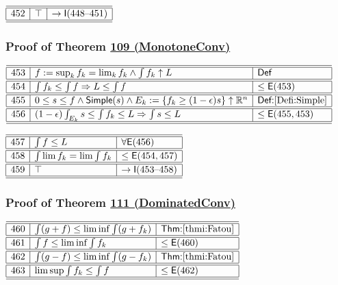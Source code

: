 \documentclass[11pt,reqno]{amsart}
\begin{document}
\medskip

\noindent$%
\begin{array}{|r|l|l|}
\hline\hline
452 & \top & \to\mathsf{I}(448\text{--}451) \\ \hline\hline
\end{array}%
$

\medskip

\subsubsection*{Proof of Theorem \hyperlink{thm:MonotoneConv}{109 (\textsf{MonotoneConv})}}

\noindent$%
\begin{array}{|r|l|l|}
\hline\hline
453 & f:=\sup_{k}f_{k}=\lim_{k}f_{k}\wedge\int f_{k}\uparrow L & \mathsf{Def} \\ \hline\hline
454 & \int f_{k}\le\int f\Rightarrow L\le\int f & \le\mathsf{E}(453) \\ \hline\hline
455 & 0\le s\le f\wedge\mathsf{Simple}(s)\wedge E_{k}:=\{f_{k}\ge(1-\epsilon)s\}\uparrow\mathbb{R}^{n} & \textsf{Def:}\ref{Defi:Simple} \\ \hline\hline
456 & (1-\epsilon)\int_{E_{k}}s\le\int f_{k}\le L\Rightarrow\int s\le L & \le\mathsf{E}(455,453) \\ \hline\hline
\end{array}%
$

\medskip

\noindent$%
\begin{array}{|r|l|l|}
\hline\hline
457 & \int f\le L & \forall\mathsf{E}(456) \\ \hline\hline
458 & \int\lim f_{k}=\lim\int f_{k} & \le\mathsf{E}(454,457) \\ \hline\hline
459 & \top & \to\mathsf{I}(453\text{--}458) \\ \hline\hline
\end{array}%
$

\medskip

\subsubsection*{Proof of Theorem \hyperlink{thm:DominatedConv}{111 (\textsf{DominatedConv})}}

\noindent$%
\begin{array}{|r|l|l|}
\hline\hline
460 & \int(g+f)\le\liminf\int(g+f_{k}) & \textsf{Thm:}\ref{thmi:Fatou} \\ \hline\hline
461 & \int f\le\liminf\int f_{k} & \le\mathsf{E}(460) \\ \hline\hline
462 & \int(g-f)\le\liminf\int(g-f_{k}) & \textsf{Thm:}\ref{thmi:Fatou} \\ \hline\hline
463 & \limsup\int f_{k}\le\int f & \le\mathsf{E}(462) \\ \hline\hline
\end{array}%
$
\end{document}
